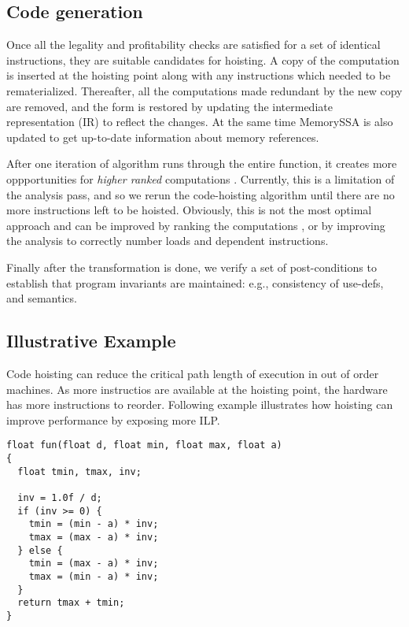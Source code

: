 \documentclass{sig-alternate}
\begin{document}
\subsection{Code generation}
Once all the legality and profitability checks are satisfied for a set of
identical instructions, they are suitable candidates for hoisting. A copy of the
computation is inserted at the hoisting point along with any instructions which
needed to be rematerialized. Thereafter, all the computations made redundant by
the new copy are removed, and the \SSA{} form is restored by updating the
intermediate representation (IR) to reflect the changes. At the same time
MemorySSA is also updated to get up-to-date information about memory references.

After one iteration of algorithm runs through the entire function, it creates
more oppportunities for \emph{higher ranked} computations
\cite{rosen1988global}. Currently, this is a limitation of the \GVN{} analysis
pass, and so we rerun the code-hoisting algorithm until there are no more
instructions left to be hoisted.  Obviously, this is not the most optimal
approach and can be improved by ranking the computations \cite{rosen1988global},
or by improving the \GVN{} analysis to correctly number loads and dependent
instructions.

Finally after the transformation is done, we verify a set of post-conditions to
establish that program invariants are maintained: e.g., consistency of use-defs,
and \SSA{} semantics.

\newpage

\subsection{Illustrative Example} \label{subsec:example}
Code hoisting can reduce the critical path length of execution in out of
order machines. As more instructios are available at the hoisting point, the
hardware has more instructions to reorder. Following example illustrates how
hoisting can improve performance by exposing more ILP.

\begin{verbatim}
float fun(float d, float min, float max, float a)
{
  float tmin, tmax, inv;

  inv = 1.0f / d;
  if (inv >= 0) {
    tmin = (min - a) * inv;
    tmax = (max - a) * inv;
  } else {
    tmin = (max - a) * inv;
    tmax = (min - a) * inv;
  }
  return tmax + tmin;
}
\end{verbatim}
\end{document}
